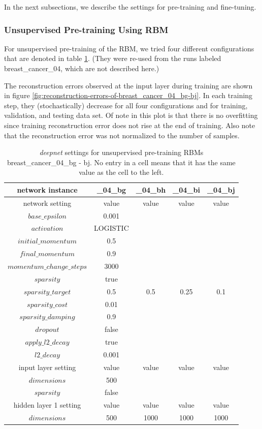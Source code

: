 In the next subsections, we describe the settings for pre-training
and fine-tuning.


\subsubsection{Unsupervised Pre-training Using RBM}

For unsupervised
pre-training of the RBM, we tried four different configurations that
are denoted in table \ref{tab:deepnet-settings-for-breast_cancer_04_bg-bj}.
(They were re-used from the runs labeled breast\_cancer\_04, which
are not described here.)

The reconstruction errors observed at the input layer during training
are shown in figure \ref{fig:reconstruction-errors-of-breast_cancer_04_bg-bj}.
In each training step, they (stochastically) decrease for all four
configurations and for training, validation, and testing data set.
Of note in this plot is that there is no overfitting since training
reconstruction error does not rise at the end of training. Also note
that the reconstruction error was not normalized to the number of
samples.

\begin{table}
\begin{centering}
\begin{tabular}{|c|c|c|c|c|}
\hline 
network instance & \_04\_bg & \_04\_bh & \_04\_bi & \_04\_bj\tabularnewline
\hline 
\hline 
network setting & value & value & value & value\tabularnewline
\hline 
\hline 
$base\textrm{\_}epsilon$ & 0.001 &  &  & \tabularnewline
\hline 
$activation$ & LOGISTIC &  &  & \tabularnewline
\hline 
$initial\textrm{\_}momentum$ & 0.5 &  &  & \tabularnewline
\hline 
$final\_momentum$ & 0.9 &  &  & \tabularnewline
\hline 
$momentum\textrm{\_}change\textrm{\_}steps$ & 3000 &  &  & \tabularnewline
\hline 
$sparsity$ & true &  &  & \tabularnewline
\hline 
$sparsity\textrm{\_}target$ & 0.5 & 0.5 & 0.25 & 0.1\tabularnewline
\hline 
$sparsity\textrm{\_}cost$ & 0.01 &  &  & \tabularnewline
\hline 
$sparsity\textrm{\_}damping$ & 0.9 &  &  & \tabularnewline
\hline 
$dropout$ & false &  &  & \tabularnewline
\hline 
$apply\textrm{\_}l2\textrm{\_}decay$ & true &  &  & \tabularnewline
\hline 
$l2\textrm{\_}decay$ & 0.001 &  &  & \tabularnewline
\hline 
\hline 
input layer setting & value & value & value & value\tabularnewline
\hline 
\hline 
$dimensions$ & 500 &  &  & \tabularnewline
\hline 
$sparsity$ & false &  &  & \tabularnewline
\hline 
\hline 
hidden layer 1 setting & value & value & value & value\tabularnewline
\hline 
\hline 
$dimensions$ & 500 & 1000 & 1000 & 1000\tabularnewline
\hline 
\end{tabular}
\par\end{centering}
\caption[\emph{deepnet }settings for unsupervised pre-training RBMs breast\_cancer\_04\_bg
- bj.]{\label{tab:deepnet-settings-for-breast_cancer_04_bg-bj}\emph{deepnet
}settings for unsupervised pre-training RBMs breast\_cancer\_04\_bg
- bj. No entry in a cell means that it has the same value as the cell
to the left.}
\end{table}

